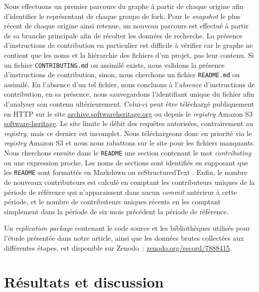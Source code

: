 \documentclass[dvipsnames,runningheads]{llncs}
\newcommand{\en}[1]{\foreignlanguage{english}{\emph{#1}}}
\begin{document}
    Nous effectuons un premier parcours du graphe à partir de chaque origine afin d'identifier le représentant
    de chaque groupe de fork. Pour le \en{snapshot} le plus récent de chaque origine ainsi retenue, un nouveau
    parcours est effectué à partir de sa branche principale afin de récolter les données de recherche. La
    présence d'instructions de contribution en particulier est difficile à vérifier car le graphe ne contient
    que les noms et la hiérarchie des fichiers d'un projet, pas leur contenu. Si un fichier
    \texttt{CONTRIBUTING.md} ou assimilé existe, nous validons la présence d'instructions de contribution,
    sinon, nous cherchons un fichier \texttt{README.md} ou assimilé. En l'absence d'un tel fichier, nous
    concluons à l'\emph{absence} d'instructions de contribution, en sa présence, nous sauvegardons
    l'identifiant unique du fichier afin d'analyser son contenu ultérieurement. Celui-ci peut être téléchargé
    publiquement en HTTP sur le site
    \href{https://archive.softwareheritage.org/}{archive.softwareheritage.org} ou depuis le \en{registry}
    Amazon S3 \href{https://registry.opendata.aws/software-heritage}{software-heritage}. Le site limite le
    débit des requêtes autorisées, contrairement au \en{registry}, mais ce dernier est incomplet. Nous
    téléchargeons donc en priorité via le \en{registry} Amazon S3 et nous nous rabattons sur le site pour les
    fichiers manquants. Nous cherchons ensuite dans le \texttt{README} une section contenant le mot
    \en{contributing} ou une expression proche. Les noms de sections sont identifiés en supposant que les
    \texttt{README} sont formattés en Markdown ou reStructuredText \parencite{markdown-headings,rst-sections}.
    Enfin, le nombre de nouveaux contributeurs est calculé en comptant les contributeurs uniques de la période
    de référence qui n'apparaissent dans aucun \en{commit} antérieur à cette période, et le nombre de
    contributeurs uniques récents en les comptant simplement dans la période de six mois précédent la période
    de référence.

    Un \en{replication package} contenant le code source et les bibliothèques utilisés pour l'étude présentée
    dans notre article, ainsi que les données brutes collectées aux différentes étapes, est disponible sur
    Zenodo : \href{https://zenodo.org/record/7888415}{zenodo.org/record/7888415}.

    \section{Résultats et discussion}
\end{document}
